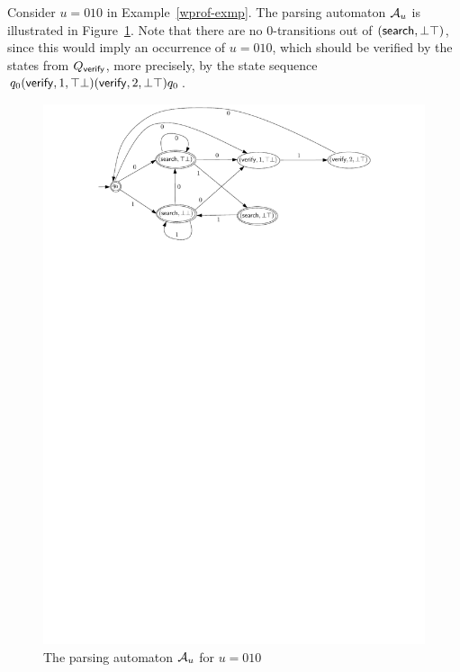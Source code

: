 
\begin{example}
Consider $u=010$ in Example~\ref{wprof-exmp}. The parsing automaton  $\mathcal{A}_u$ is illustrated in Figure~\ref{fig-pa-exmp}. Note that there are no $0$-transitions out of $(\mathsf{search}, \bot\top)$, since this would imply an occurrence of $u = 010$, which should be verified by the states from $Q_{\mathsf{verify}}$, more precisely, by the state sequence $q_0 (\mathsf{verify}, 1, \top\bot) (\mathsf{verify}, 2, \bot\top)q_0$.
\begin{figure}[htbp]
\begin{center}
\includegraphics[scale=0.6]{parsing-automata-example.pdf}
\end{center}
\caption{The parsing automaton $\mathcal{A}_u$ for $u = 010$}\label{fig-pa-exmp}
\end{figure}
\end{example}

